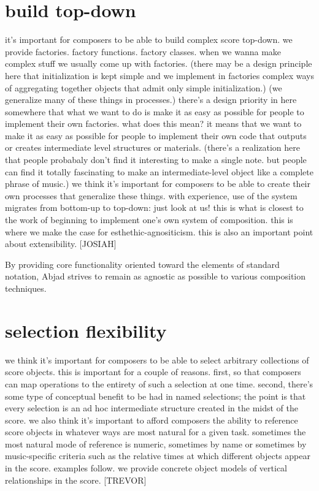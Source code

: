 \documentclass{article}
\begin{document}
\section{build top-down}

it's important for composers to be able to build complex
score top-down. we provide factories. factory functions. factory classes. when
we wanna make complex stuff we usually come up with factories. (there may be a
design principle here that initialization is kept simple and we implement in
factories complex ways of aggregating together objects that admit only simple
initialization.) (we generalize many of these things in processes.) there's a
design priority in here somewhere that what we want to do is make it as easy as
possible for people to implement their own factories. what does this mean? it
means that we want to make it as easy as possible for people to implement their
own code that outputs or creates intermediate level structures or materials.
(there's a realization here that people probabaly don't find it interesting to
make a single note. but people can find it totally fascinating to make an
intermediate-level object like a complete phrase of music.) we think it's
important for composers to be able to create their own processes that
generalize these things. with experience, use of the system migrates from
bottom-up to top-down: just look at us! this is what is closest to the work of
beginning to implement one's own system of composition. this is where we make
the case for esthethic-agnositicism. this is also an important point about
extensibility. [JOSIAH]

\hrulefill\vspace{5pt}

By providing core functionality oriented toward the elements of standard
notation, Abjad strives to remain as agnostic as possible to various
composition techniques. 

\section{selection flexibility}

we think it's important for composers to be able to select arbitrary
collections of score objects. this is important for a couple of reasons. first,
so that composers can map operations to the entirety of such a selection at one
time. second, there's some type of conceptual benefit to be had in named
selections; the point is that every selection is an ad hoc intermediate
structure created in the midst of the score. we also think it's important to
afford composers the ability to reference score objects in whatever ways are
most natural for a given task. sometimes the most natural mode of reference is
numeric, sometimes by name or sometimes by music-specific criteria such as the
relative times at which different objects appear in the score. examples follow.
we provide concrete object models of vertical relationships in the score.
[TREVOR]
\end{document}
